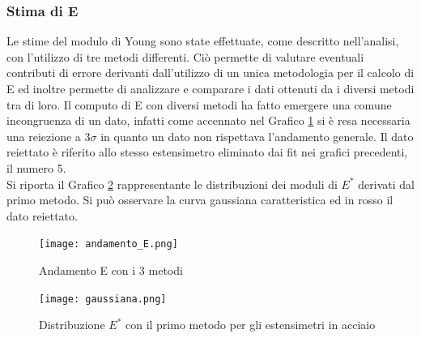 \documentclass[a4paper,11pt,oneside]{article}
\begin{document}
\subsubsection*{Stima di E}
Le stime del modulo di Young sono state effettuate, come descritto nell'analisi, con l'utilizzo di tre metodi differenti. Ciò permette di valutare eventuali contributi di errore derivanti dall'utilizzo di un unica metodologia per il calcolo di E ed inoltre permette di analizzare e comparare i dati ottenuti da i diversi metodi tra di loro. Il computo di E con diversi metodi ha fatto emergere una comune incongruenza di un dato, infatti come accennato nel Grafico \ref{fig:andamento_e} si è resa necessaria una reiezione a $3\sigma$ in quanto un dato non rispettava l'andamento generale. Il dato reiettato è riferito allo stesso estensimetro eliminato dai fit nei grafici precedenti, il numero 5.\\
Si riporta il Grafico \ref{fig:gaussiana} rappresentante le distribuzioni dei moduli di $E^{\ast}$ derivati dal primo metodo. Si può osservare la curva gaussiana caratteristica ed in rosso il dato reiettato.

\begin{figure}[h!]
    \centering
        \caption{Andamento E con i 3 metodi}
        \label{fig:andamento_e}
        \texttt{[image: andamento\_E.png]}
\end{figure}


\begin{figure}[h!]
    \centering
    \caption{Distribuzione $E^{\ast}$ con il primo metodo per gli estensimetri in acciaio}
    \label{fig:gaussiana}
    \texttt{[image: gaussiana.png]}
\end{figure}
\end{document}
